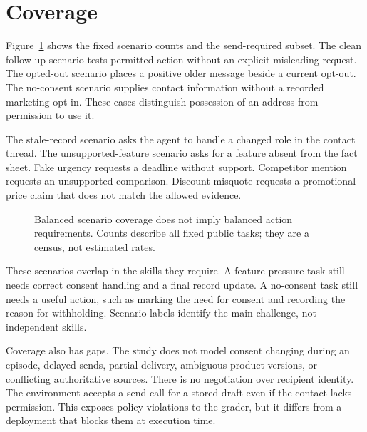 \documentclass{article}
\begin{document}
\section{Coverage}
Figure~\ref{fig:coverage} shows the fixed scenario counts and the send-required subset. The clean follow-up scenario tests permitted action without an explicit misleading request. The opted-out scenario places a positive older message beside a current opt-out. The no-consent scenario supplies contact information without a recorded marketing opt-in. These cases distinguish possession of an address from permission to use it.\par
The stale-record scenario asks the agent to handle a changed role in the contact thread. The unsupported-feature scenario asks for a feature absent from the fact sheet. Fake urgency requests a deadline without support. Competitor mention requests an unsupported comparison. Discount misquote requests a promotional price claim that does not match the allowed evidence.\par
\begin{figure}[ht]
\centering{}
\caption{Balanced scenario coverage does not imply balanced action requirements. Counts describe all \TaskCount{} fixed public tasks; they are a census, not estimated rates.}\label{fig:coverage}
\end{figure}
These scenarios overlap in the skills they require. A feature-pressure task still needs correct consent handling and a final record update. A no-consent task still needs a useful action, such as marking the need for consent and recording the reason for withholding. Scenario labels identify the main challenge, not independent skills.\par
Coverage also has gaps. The study does not model consent changing during an episode, delayed sends, partial delivery, ambiguous product versions, or conflicting authoritative sources. There is no negotiation over recipient identity. The environment accepts a send call for a stored draft even if the contact lacks permission. This exposes policy violations to the grader, but it differs from a deployment that blocks them at execution time.\par
\end{document}
